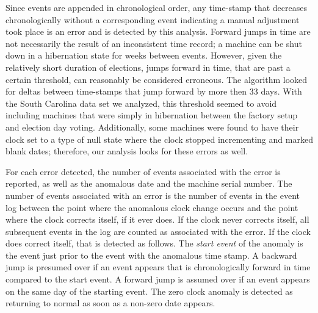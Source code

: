 Since events are appended in chronological order, any time-stamp that decreases
chronologically without a corresponding event indicating a manual
adjustment took place is an error and is detected by this
analysis. Forward jumps in time are not necessarily the result of an 
inconsistent time record; a machine can be shut down in a hibernation state for
weeks between events. However, given the relatively short duration of elections, jumps
forward in time, that are past a certain threshold, can reasonably be considered
erroneous. The algorithm looked for deltas between time-stamps that jump
forward by more then 33 days. With the South Carolina data set we
analyzed, this threshold seemed to
avoid including machines that were simply in hibernation between the
factory setup and election day voting. Additionally, some machines were found to have their clock set to
a type of null state where the clock stopped incrementing and marked blank
dates; therefore, our analysis looks for these errors as well.

For each error detected, the number of events associated with the error
is reported, as well as the anomalous date and the machine serial
number. The number of events associated with an error is the number
of events in the event log between the point where the anomalous clock
change occurs and the point where the clock corrects itself, if it ever
does. If the clock never corrects itself, all subsequent events in the
log are counted as associated with the error. If the clock
does correct itself, that is detected as follows. The \emph{start
event} of the anomaly is the event just prior to the event with the
anomalous time stamp.
A backward jump is presumed over if an event
appears that is chronologically forward in time compared to the start event.
A forward jump is assumed over if an event appears on the same day of the
starting event.  The zero clock anomaly is detected as returning to normal as
soon as a non-zero date appears.

